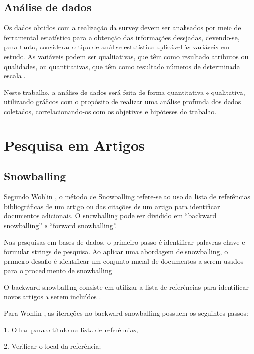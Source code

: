 \subsection{Análise de dados}

Os dados obtidos com a realização da survey devem ser analisados por meio de ferramental estatístico para a obtenção das informações desejadas, devendo-se, para tanto, considerar o tipo de análise estatística aplicável às variáveis em estudo. As variáveis podem ser qualitativas, que têm como resultado atributos ou qualidades, ou quantitativas, que têm como resultado números de determinada escala \cite{freitas2000metodo}.

Neste trabalho, a análise de dados será feita de forma quantitativa e qualitativa, utilizando gráficos com o propósito de realizar uma análise profunda dos dados coletados, correlacionando-os com os objetivos e hipóteses do trabalho. 

\section{Pesquisa em Artigos}

\subsection{Snowballing}

Segundo Wohlin \cite{wohlin2014guidelines}, o método de Snowballing refere-se ao uso da lista de referências bibliográficas de um artigo ou das citações de um artigo para identificar documentos adicionais. O snowballing pode ser dividido em ``backward snowballing'' e ``forward snowballing''.

Nas pesquisas em bases de dados, o primeiro passo é identificar palavras-chave e formular strings de pesquisa. Ao aplicar uma abordagem de snowballing, o primeiro desafio é identificar um conjunto inicial de documentos a serem usados para o procedimento de snowballing \cite{wohlin2014guidelines}.

O backward snowballing consiste em utilizar a lista de referências para identificar novos artigos a serem incluídos \cite{wohlin2014guidelines}.

Para Wohlin \cite{wohlin2014guidelines}, as iterações no backward snowballing possuem os seguintes passos:

1. Olhar para o título na lista de referências;

2. Verificar o local da referência;


